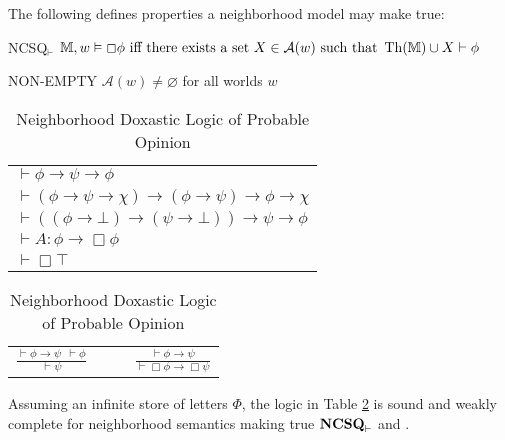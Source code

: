 \begin{definition}
  The following defines properties a neighborhood model may make true:
  \begin{descriptiondash}
    \item[NCSQ$_\vdash$] $\mathbb{M}, w \vDash \Box \phi \text{ iff there exists a set
    $X \in \mathcal{A}(w)$ such that } \operatorname{Th} (\mathbb{M}) \cup X \vdash
    \phi$
    \item[NON-EMPTY] $\mathcal{A}(w)
      \neq \varnothing$ for all worlds $w$
  \end{descriptiondash}
\end{definition}

\begin{table}[h]
\begin{centering}
  \begin{tabular}{l}
    $\vdash \phi \rightarrow \psi \rightarrow \phi$\\
    $\vdash (\phi \rightarrow \psi \rightarrow \chi) \rightarrow (\phi
    \rightarrow \psi) \rightarrow \phi \rightarrow \chi$\\
    $\vdash ((\phi \rightarrow \bot) \rightarrow (\psi \rightarrow \bot))
    \rightarrow \psi \rightarrow \phi$\\
    $\vdash A : \phi \rightarrow \Box \phi$\\
    $\vdash \Box \top$
  \end{tabular}

    \begin{tabular}{lll}
      $\displaystyle\frac{\vdash \phi \rightarrow \psi \ \ \vdash \phi}{\vdash
      \psi}$ & \ \ & $\displaystyle\frac{\vdash \phi \rightarrow \psi}{\vdash \Box \phi
      \rightarrow \Box \psi}$
    \end{tabular}
  \caption{\label{logic3}Neighborhood Doxastic Logic of
    Probable Opinion}
\end{centering}
\end{table}

\begin{theorem}
  Assuming an infinite store of letters $\Phi$, the logic in Table
  \ref{logic3} is sound and weakly complete for neighborhood semantics making
  true $\textup{{\bfseries{NCSQ}}}_\vdash$ and .
\end{theorem}

